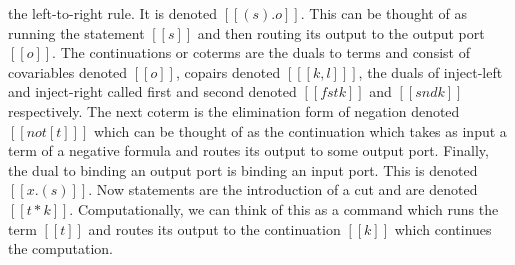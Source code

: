 the left-to-right rule.  It is denoted $[[(s).o]]$.  This can be thought
of as running the statement $[[s]]$ and then routing its output to the output
port $[[o]]$.  The continuations or coterms are the duals to terms and consist of covariables
denoted $[[o]]$, copairs denoted $[[ [k,l] ]]$, the duals of inject-left and
inject-right called first and second denoted $[[fst k]]$ and $[[snd k]]$ respectively.
The next coterm is the elimination form of negation denoted $[[ not[t] ]]$ which
can be thought of as the continuation which takes as input a term of a negative 
formula and routes its output to some output port.  Finally, the dual to binding
an output port is binding an input port.  This is denoted $[[x.(s)]]$.  Now statements
are the introduction of a cut and are denoted $[[t * k]]$.  Computationally, we
can think of this as a command which runs the term $[[t]]$ and routes its output
to the continuation $[[k]]$ which continues the computation.

